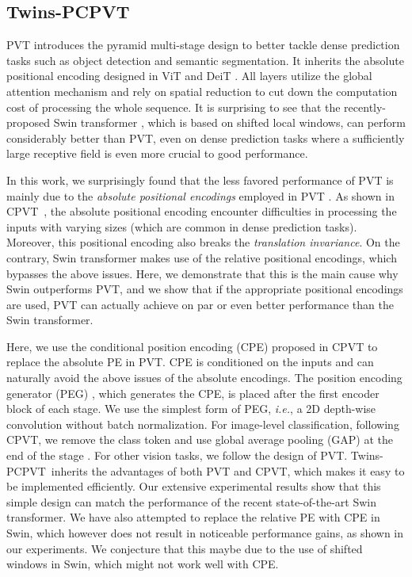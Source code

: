 \documentclass{article}
\def \ie {\textit{i.e.}\xspace}
\def \pcpvt  {Twins-PCPVT}
\begin{document}
\subsection{\pcpvt}
PVT \cite{wang2021pyramid} introduces the pyramid multi-stage design to better 
tackle 
dense prediction 
tasks such as object detection  and semantic segmentation. It inherits the absolute positional encoding  designed in ViT \cite{dosovitskiy2021an} and DeiT \cite{touvron2020training}. All layers utilize the global attention mechanism and rely on  spatial reduction to cut down the computation cost of 
processing 
the whole sequence. It is surprising to see that the recently-proposed Swin 
transformer
\cite{liu2021swin}, which is based on shifted local windows, can perform considerably better than PVT, even on dense prediction tasks where a 
sufficiently 
large receptive field is even more crucial to good performance. 


In this work, we surprisingly found that the less favored performance of PVT is 
mainly 
due to the \textit{absolute positional encodings} employed in PVT  \cite{wang2021pyramid}. 
As shown in CPVT~\cite{chu2021ConditionalPE}, the absolute positional encoding encounter  
difficulties in processing 
the inputs with varying sizes (which are common in dense prediction tasks). Moreover, this positional encoding also breaks the \emph{translation invariance}. On the contrary, Swin transformer makes use of the relative positional encodings, which bypasses the above issues. Here, we demonstrate 
that this is the main cause why Swin outperforms PVT, and we show that if the appropriate 
positional encodings are used, PVT can actually achieve on par or even better performance than the Swin transformer.




Here, we use the conditional position encoding (CPE) proposed in CPVT \cite{chu2021ConditionalPE} to replace the absolute PE 
in PVT. CPE is conditioned on the inputs and can naturally avoid the above issues of the absolute encodings.  The position encoding generator (PEG) \cite{chu2021ConditionalPE}, 
which generates the CPE, is placed after the first encoder block of each stage. We use the simplest form of PEG, \ie, a 2D depth-wise convolution without batch normalization. For image-level classification, following CPVT, we remove the class token and use global average pooling (GAP) at the end of the stage \cite{chu2021ConditionalPE}. For other vision 
tasks, we follow the design of PVT. \pcpvt\ inherits the advantages of 
both PVT and CPVT, which makes it easy to be implemented efficiently. 
Our 
extensive experimental results show 
that 
this simple design can match the performance of the recent state-of-the-art Swin
transformer.  We have also attempted to replace the relative PE with CPE in Swin, which however does not result in noticeable performance gains, as shown in our experiments. We conjecture that this maybe 
due to the use of shifted windows in Swin, which might not work well with CPE.
\end{document}
